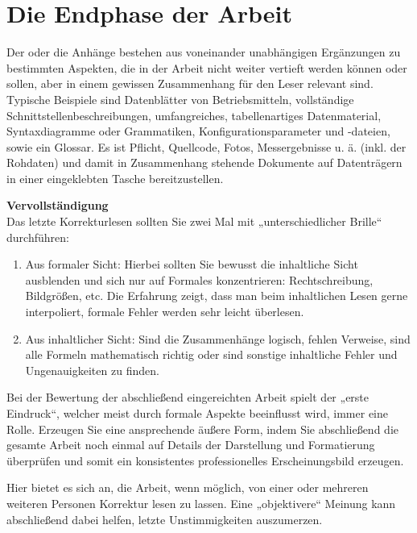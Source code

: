 
\chapter{Die Endphase der Arbeit}

Der oder die Anhänge bestehen aus voneinander unabhängigen Ergänzungen zu bestimmten Aspekten, die in der Arbeit nicht weiter vertieft werden können oder sollen, aber in einem gewissen Zusammenhang für den Leser relevant sind. Typische Beispiele sind Datenblätter von Betriebsmitteln, vollständige Schnittstellenbeschreibungen, umfangreiches, tabellenartiges Datenmaterial, Syntaxdiagramme oder Grammatiken, Konfigurationsparameter und -dateien, sowie ein Glossar. Es ist Pflicht, Quellcode, Fotos, Messergebnisse u. ä. (inkl. der Rohdaten) und damit in Zusammenhang stehende Dokumente auf Datenträgern in einer eingeklebten Tasche bereitzustellen.




\textbf{Vervollständigung} \\
Das letzte Korrekturlesen sollten Sie zwei Mal mit „unterschiedlicher Brille“
durchführen:
\begin{enumerate}
    \item Aus formaler Sicht: Hierbei sollten Sie bewusst die inhaltliche Sicht
ausblenden und sich nur auf Formales konzentrieren: Rechtschreibung,
Bildgrößen, etc. Die Erfahrung zeigt, dass man beim inhaltlichen Lesen gerne
interpoliert, formale Fehler werden sehr leicht überlesen.
    \item Aus inhaltlicher Sicht: Sind die Zusammenhänge logisch, fehlen Verweise, sind alle Formeln mathematisch richtig oder sind sonstige inhaltliche Fehler und Ungenauigkeiten zu finden.
\end{enumerate}

Bei der Bewertung der abschließend eingereichten Arbeit spielt der „erste Eindruck“, welcher meist durch formale Aspekte beeinflusst wird, immer eine Rolle. Erzeugen Sie eine ansprechende äußere Form, indem Sie abschließend die gesamte Arbeit noch einmal auf Details der Darstellung und Formatierung überprüfen und somit ein konsistentes professionelles Erscheinungsbild erzeugen.

Hier bietet es sich an, die Arbeit, wenn möglich, von einer oder mehreren weiteren Personen Korrektur lesen zu lassen. Eine „objektivere“ Meinung kann abschließend dabei helfen, letzte Unstimmigkeiten auszumerzen.



